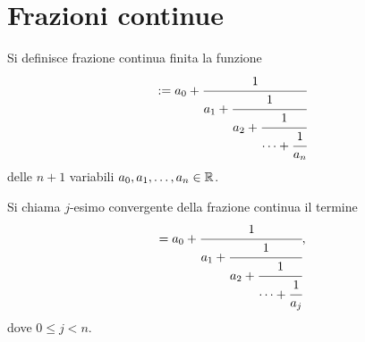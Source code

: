 \chapter{Frazioni continue}\label{app:Cont_frac}
\begin{defn}
 Si definisce {\upshape frazione continua finita} la funzione
 \begin{equation}
  [a_0;a_1,a_2,\dots,a_n] :=
  a_0 + \cfrac{1}{a_1 
      + \cfrac{1}{a_2 
      + \cfrac{1}{\dots + \cfrac{1}{a_n} } } }
 \end{equation}
 delle $n + 1$ variabili $a_0, a_1, \dots, a_n \in \mathbb{R}$.
 
 Si chiama {\upshape $j$-esimo convergente} della frazione continua il termine
 \begin{equation}
  [a_0;a_1,a_2,\dots,a_j] = 
  a_0 + \cfrac{1}{a_1 
      + \cfrac{1}{a_2 
      + \cfrac{1}{\dots + \cfrac{1}{a_j} } } },
 \end{equation}
 dove $0 \leq j < n$.
\end{defn}

